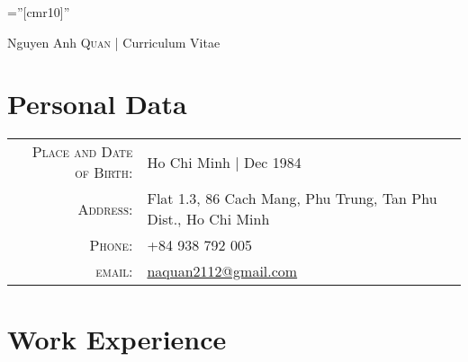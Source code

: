 \documentclass[a4paper,10pt]{article}
\begin{document}

\pagestyle{empty} %

\font\fb=''[cmr10]'' %

\par{\centering
		{\Huge Nguyen Anh \textsc{Quan} | Curriculum Vitae
	}\bigskip\par}

\section{Personal Data}

\begin{tabular}{rl}
    \textsc{Place and Date of Birth:} & Ho Chi Minh | Dec 1984 \\
    \textsc{Address:}   & Flat 1.3, 86 Cach Mang, Phu Trung, Tan Phu Dist., Ho Chi Minh\\
    \textsc{Phone:}     & +84 938 792 005\\
    \textsc{email:}     & \href{mailto:naquan2112@gmail.com}{naquan2112@gmail.com}
\end{tabular}

\section{Work Experience}
\end{document}
